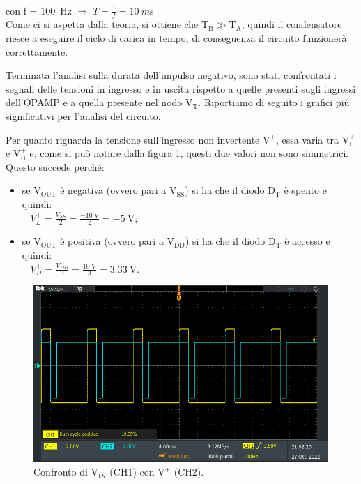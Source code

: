 \documentclass{report}
\begin{document}
\\[4pt]\indent con f = \SI{100}{\hertz} $\Rightarrow\;\displaystyle{T=\frac{1}{f}=\SI{10}{m\second}}$
\\[4pt]Come ci si aspetta dalla teoria, si ottiene che $\mathrm{T_B}\gg\mathrm{T_A}$, quindi il condensatore riesce a eseguire il ciclo di carica in tempo, di conseguenza il circuito funzionerà correttamente.\par
Terminata l'analisi sulla durata dell'impulso negativo, sono stati confrontati i segnali delle tensioni in ingresso e in uscita rispetto a quelle presenti sugli ingressi dell'OPAMP e a quella presente nel nodo $\mathrm{V_T}$. Riportiamo di seguito i grafici più significativi per l'analisi del circuito.\par
Per quanto riguarda la tensione sull'ingresso non invertente $\mathrm{V^+}$, essa varia tra $\mathrm{V_L^+}$ e $\mathrm{V_H^+}$ e, come si può notare dalla figura \ref{figura:TEK00003}, questi due valori non sono simmetrici. Questo succede perché:
\begin{itemize}
	\item se $\mathrm{V_{OUT}}$ è negativa (ovvero pari a $\mathrm{V_{SS}}$) si ha che il diodo $\mathrm{D_T}$ è spento e quindi:
	\\[4pt]$\displaystyle{\;\;\;V_L^+=\frac{V_{SS}}{2}=\frac{\SI{-10}{\volt}}{2}=\SI{-5}{\volt}}$;
	\item se $\mathrm{V_{OUT}}$ è positiva (ovvero pari a $\mathrm{V_{DD}}$) si ha che il diodo $\mathrm{D_T}$ è accesso e quindi:
	\\[4pt]$\displaystyle{\;\;\;V_H^+=\frac{V_{DD}}{3}=\frac{\SI{10}{\volt}}{3}=\SI{3.33}{\volt}}$.
\end{itemize}
\begin{figure}[h!]
	\centering
	\includegraphics[height=6.7cm]{immagini/TEK00003}
	\caption{Confronto di $\mathrm{V_{IN}}$ (CH1) con $\mathrm{V^+}$ (CH2).}
	\label{figura:TEK00003}
\end{figure}
\end{document}
